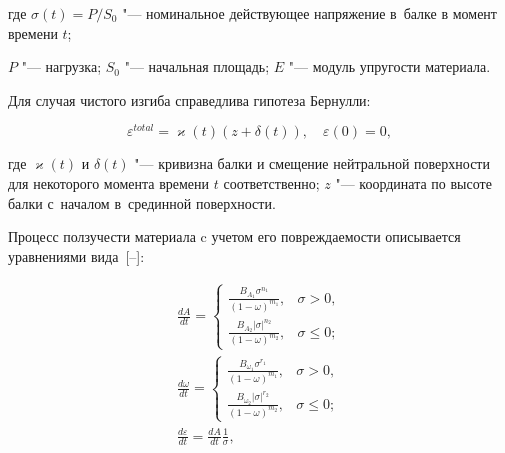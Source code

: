  где $\sigma(t)=P/S_0$  "--- номинальное действующее напряжение в~балке в момент времени $t$; 

 $P$ "--- нагрузка; $S_0$ "--- начальная площадь; $E$ "--- модуль упругости материала.

 

Для случая чистого изгиба справедлива гипотеза Бернулли:

\begin{equation}\label{iya:ursigma}

\varepsilon^{total}=\varkappa(t)(z+\delta(t)),\quad \varepsilon(0)=0,

		\end{equation}     

где $\varkappa(t)$ и $\delta(t)$ "--- кривизна балки и смещение нейтральной поверхности  для некоторого момента времени $t$ соответственно; $z$ "--- координата по высоте балки с~началом в~срединной поверхности.



Процесс ползучести материала c учетом его повреждаемости описывается уравнениями вида~[--]:

\begin{equation}

\label{iya:sist}

\begin{array}{l}

\displaystyle 

\frac{dA}{dt}=

    \begin{cases}

    \displaystyle 

	\frac{B_{A_{1}}\sigma^{n_1}}{ (1-\omega)^{m_1}}, & \sigma>0,    \\[2mm]

    \displaystyle 	

	\frac{B_{A_{2}}|\sigma|^{n_2}}{ (1-\omega)^{m_2}},& \sigma\leq 0;

	\end{cases}

\\[5mm]

\displaystyle

	\frac{d\omega}{dt}=

    \begin{cases}

    \displaystyle

	\frac{B_{\omega_{1}}\sigma^{r_1}}{(1-\omega)^{m_1}},& \sigma>0,    \\[2mm]

	\displaystyle

	\frac{B_{\omega_{2}}|\sigma|^{r_2}}{(1-\omega)^{m_2}}, & \sigma\leq 0;

	\end{cases}

\\[5mm]

\displaystyle

	\frac{d\varepsilon}{dt}=\frac{dA}{dt}\frac{1}{\sigma},

     \end{array}

  \end{equation}

